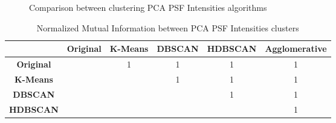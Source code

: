 \begin{figure*}[ht!]
				\caption{Comparison between clustering PCA PSF Intensities algorithms}
			\end{figure*}
		\FloatBarrier
		
		\begin{table}[h!]
    			\centering
    			\begin{tabular}{|c|c|c|c|c|c|}
        			\hline
        			& \textbf{Original} & \textbf{K-Means} & \textbf{DBSCAN} & \textbf{HDBSCAN} & \textbf{Agglomerative} \\
        			\hline
        			\textbf{Original} & \diagbox{}{} & 1 & 1 & 1 & 1 \\
       			\hline
        			\textbf{K-Means} &  & \diagbox{}{} & 1 & 1 & 1\\
        			\hline
        			\textbf{DBSCAN} &  &  & \diagbox{}{} & 1 & 1\\
        			\hline
        			\textbf{HDBSCAN} &  &  &  & \diagbox{}{} & 1\\
       			\hline
    			\end{tabular}
    			\caption{Normalized Mutual Information between PCA PSF Intensities clusters}
		\end{table}
		
